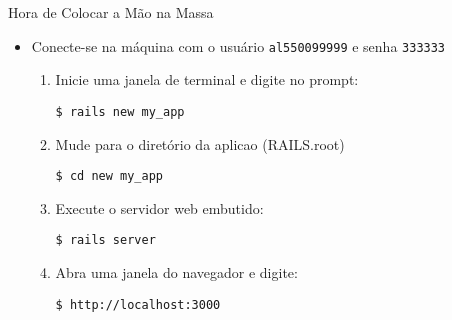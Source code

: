 \begin{frame}[fragile,t]{Hora de Colocar a Mão na Massa}
	\begin{itemize}
		\item Conecte-se na máquina com o usuário \verb|al550099999| e senha \verb|333333|
		\begin{enumerate}
	    \item Inicie uma janela de terminal e digite no prompt:
	     \begin{lstlisting}[style=BashInputBasicStyle]
	     $ rails new my_app
	     \end{lstlisting}

	    \item Mude para o diretório da aplicao (RAILS.root)
	     \begin{lstlisting}[style=BashInputBasicStyle]
	     $ cd new my_app
	     \end{lstlisting}
    
	    \item Execute o servidor web embutido:
	    \begin{lstlisting}[style=BashInputBasicStyle]
	    $ rails server
	    \end{lstlisting}
	    
	    \item Abra uma janela do navegador e digite:
	     \begin{lstlisting}[style=BashInputBasicStyle]
	     $ http://localhost:3000
	     \end{lstlisting}
	  \end{enumerate}
	\end{itemize}
  
\end{frame}